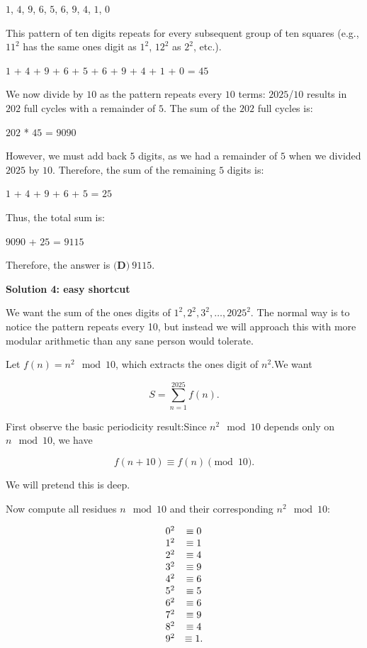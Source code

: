 \begin{enumerate}
 
$1$, $4$, $9$, $6$, $5$, $6$, $9$, $4$, $1$, $0$ 

 


 This pattern of ten digits repeats for every subsequent group of ten squares (e.g., \(11^2\) has the same ones digit as \(1^2\), \(12^2\) as \(2^2\), etc.).

 
$1$ + $4$ + $9$ + $6$ + $5$ + $6$ + $9$ + $4$ + $1$ + $0$ = $45$ 

 
We now divide by $10$ as the pattern repeats every $10$ terms: $2025$/$10$ results in $202$ full cycles with a remainder of $5$. The sum of the $202$ full cycles is:

 
$202$ * $45$ = $9090$ 

 
However, we must add back $5$ digits, as we had a remainder of $5$ when we divided $2025$ by $10$. Therefore, the sum of the remaining $5$ digits is:

 
$1$ + $4$ + $9$ + $6$ + $5$ = $25$ 

 
Thus, the total sum is:

 
$9090$ + $25$ = $9115$ 

 Therefore, the answer is $\boxed{\textbf{(D)}~9115}$.

 



\textbf{Solution 4: easy shortcut}

We want the sum of the ones digits of \( 1^2, 2^2, 3^2, \ldots, 2025^2 \). The normal way is to notice the pattern repeats every 10, but instead we will approach this with more modular arithmetic than any sane person would tolerate.

 Let \( f(n) = n^2 \mod 10 \), which extracts the ones digit of \( n^2 \).We want

 
 \[S = \sum_{n=1}^{2025} f(n).\]

 First observe the basic periodicity result:Since \( n^2 \mod 10 \) depends only on \( n \mod 10 \), we have

 
 \[f(n+10) \equiv f(n) \pmod{10}.\]

 We will pretend this is deep.

 Now compute all residues \( n \mod 10 \) and their corresponding \( n^2 \mod 10 \):

 
 \[\begin{array}{c c} 0^2 & \equiv 0 \\ 1^2 & \equiv 1 \\ 2^2 & \equiv 4 \\ 3^2 & \equiv 9 \\ 4^2 & \equiv 6 \\ 5^2 & \equiv 5 \\ 6^2 & \equiv 6 \\ 7^2 & \equiv 9 \\ 8^2 & \equiv 4 \\ 9^2 & \equiv 1. \end{array}\]


\end{enumerate}
